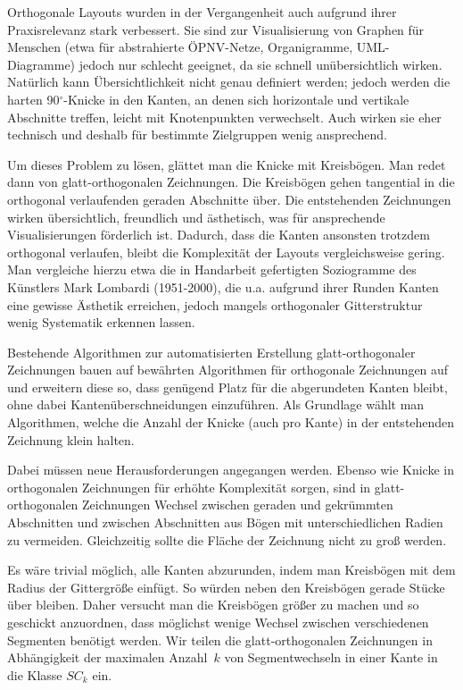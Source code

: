 \documentclass[a4paper]{scrreprt}
\theoremstyle{definition}
\newcommand{\degree}{\ensuremath{^\circ}}
\begin{document}
Orthogonale Layouts wurden in der Vergangenheit auch aufgrund ihrer Praxisrelevanz stark verbessert. Sie sind zur Visualisierung von Graphen für Menschen (etwa für abstrahierte ÖPNV-Netze, Organigramme, UML-Diagramme) jedoch nur schlecht geeignet, da sie schnell unübersichtlich wirken. %
Natürlich kann Übersichtlichkeit nicht genau definiert werden; jedoch werden die harten 90\degree-Knicke in den Kanten, an denen sich horizontale und vertikale Abschnitte treffen, leicht mit Knotenpunkten verwechselt. Auch wirken sie eher technisch und deshalb für bestimmte Zielgruppen wenig ansprechend.

Um dieses Problem zu lösen, glättet man die Knicke mit Kreisbögen. Man redet dann von glatt-orthogonalen Zeichnungen. Die Kreisbögen gehen tangential in die orthogonal verlaufenden geraden Abschnitte über. Die entstehenden Zeichnungen wirken übersichtlich, freundlich und ästhetisch, was für ansprechende Visualisierungen förderlich ist. Dadurch, dass die Kanten ansonsten trotzdem orthogonal verlaufen, bleibt die Komplexität der Layouts vergleichsweise gering. Man vergleiche hierzu etwa die in Handarbeit gefertigten Soziogramme des Künstlers Mark Lombardi (1951-2000), die u.a. aufgrund ihrer Runden Kanten eine gewisse Ästhetik erreichen, jedoch mangels orthogonaler Gitterstruktur wenig Systematik erkennen lassen. 

Bestehende Algorithmen zur automatisierten Erstellung glatt-orthogonaler Zeichnungen bauen auf bewährten Algorithmen für orthogonale Zeichnungen auf und erweitern diese so, dass genügend Platz für die abgerundeten Kanten bleibt, ohne dabei Kantenüberschneidungen einzuführen. Als Grundlage wählt man Algorithmen, welche die Anzahl der Knicke (auch pro Kante) in der entstehenden Zeichnung klein halten. 

Dabei müssen neue Herausforderungen angegangen werden. Ebenso wie Knicke in orthogonalen Zeichnungen für erhöhte Komplexität sorgen, sind in glatt-orthogonalen Zeichnungen Wechsel zwischen geraden und gekrümmten Abschnitten und zwischen Abschnitten aus Bögen mit unterschiedlichen Radien zu vermeiden. Gleichzeitig sollte die Fläche der Zeichnung nicht zu groß werden.

Es wäre trivial möglich, alle Kanten abzurunden, indem man Kreisbögen mit dem Radius der Gittergröße einfügt. So würden neben den Kreisbögen gerade Stücke über bleiben. Daher versucht man die Kreisbögen größer zu machen und so geschickt anzuordnen, dass möglichst wenige Wechsel zwischen verschiedenen Segmenten benötigt werden. Wir teilen die glatt-orthogonalen Zeichnungen in Abhängigkeit der maximalen Anzahl~$k$ von Segmentwechseln in einer Kante in die Klasse $SC_k$ ein. 
\end{document}
